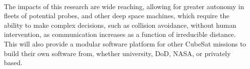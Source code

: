\\The impacts of this research are wide reaching, allowing for greater autonomy in fleets of potential probes, and other deep space machines, which require the ability to make complex decisions, such as collision avoidance, without human intervention, as communication increases as a function of irreducible distance. This will also provide a modular software platform for other CubeSat missions to build their own software from, whether university, DoD, NASA, or privately based.



